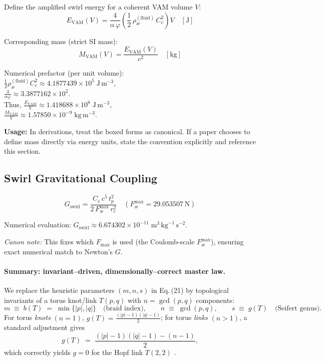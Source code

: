 \documentclass[11pt, a4paper]{article}
\begin{document}
Define the amplified swirl energy for a coherent VAM volume $V$:
\begin{equation}
E_{\text{VAM}}(V) = \frac{4}{\alpha\,\varphi} \left( \frac{1}{2}\,\rho_{\text{\ae}}^{(\text{fluid})}\,C_e^{2} \right) V
\quad [\text{J}]
\end{equation}

Corresponding mass (strict SI mass):
\begin{equation}
M_{\text{VAM}}(V) = \frac{E_{\text{VAM}}(V)}{c^{2}}
\quad [\text{kg}]
\end{equation}

Numerical prefactor (per unit volume):\\
$\frac{1}{2}\rho_{\text{\ae}}^{(\text{fluid})}C_e^2 \approx 4.1877439\times10^{5}\;\text{J}\,\text{m}^{-3}$,\\
$\frac{4}{\alpha\varphi} \approx 3.3877162\times10^{2}$.\\
Thus, $\frac{E_{\text{VAM}}}{V} \approx 1.418688\times10^{8}\;\text{J}\,\text{m}^{-3}$,\\
$\frac{M_{\text{VAM}}}{V} \approx 1.57850\times10^{-9}\;\text{kg}\,\text{m}^{-3}$.

\textbf{Usage:} In derivations, treat the boxed forms as canonical. If a paper chooses to define mass directly via energy units, state the convention explicitly and reference this section.

\subsection{Swirl Gravitational Coupling}

\begin{equation}
G_{\text{swirl}} = \frac{C_e\,c^{5}\,t_p^{2}}{2\,F_{\text{\ae}}^{\max}\,r_c^{2}}
\quad \left( F_{\text{\ae}}^{\max}=29.053507\,\text{N} \right)
\end{equation}

Numerical evaluation: $G_{\text{swirl}} \approx 6.674302\times10^{-11}\;\text{m}^3\,\text{kg}^{-1}\,\text{s}^{-2}$.

\textit{Canon note:} This fixes which $F_{\max}$ is used (the Coulomb-scale $F_{\text{\ae}}^{\max}$), ensuring exact numerical match to Newton’s $G$.

\paragraph{Summary: invariant--driven, dimensionally–correct master law.}
We replace the heuristic parameters \((m,n,s)\) in Eq.\,(21) by topological invariants of a torus knot/link \(T(p,q)\) with \(n=\gcd(p,q)\) components:
\[
    m \;\equiv\; b(T) \;=\; \min\{|p|,|q|\}\quad\text{(braid index)},\qquad
    n \;\equiv\; \gcd(p,q),\qquad
    s \;\equiv\; g(T)\quad\text{(Seifert genus)}.
\]
For torus \emph{knots} \((n=1)\), \(g(T)=\frac{(|p|-1)(|q|-1)}{2}\); for torus \emph{links} \((n>1)\), a standard adjustment gives
\[
    g(T)\;=\;\frac{(|p|-1)(|q|-1)-(n-1)}{2},
\]
which correctly yields \(g=0\) for the Hopf link \(T(2,2)\) \cite{Rolfsen1976Knots,Lickorish1997Knots,Murasugi1996KnotTheory}.
\end{document}
